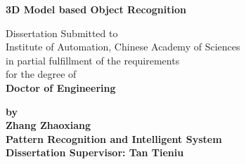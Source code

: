 
\thispagestyle{empty} %

\vspace*{0.5cm} %
\begin{center} \erhao \hei \textsf{\textbf{3D Model based Object Recognition}}
\end{center}

\vspace*{0.5cm} %
\begin{center}
\sanhao Dissertation Submitted to\\
Institute of Automation, Chinese Academy of Sciences\\
in partial fulfillment of the requirements\\
for the degree of\\
\textsf{\textbf{Doctor of Engineering}}
\end{center}

\vspace{1.0cm}
\begin{center}
\textsf{\textbf{by}}\\
\textsf{\textbf{Zhang Zhaoxiang}}\\
\textsf{\textbf{Pattern Recognition and Intelligent System}}\\
\vspace{1.0cm} \textsf{\textbf{Dissertation Supervisor: Tan Tieniu}}
\end{center}
